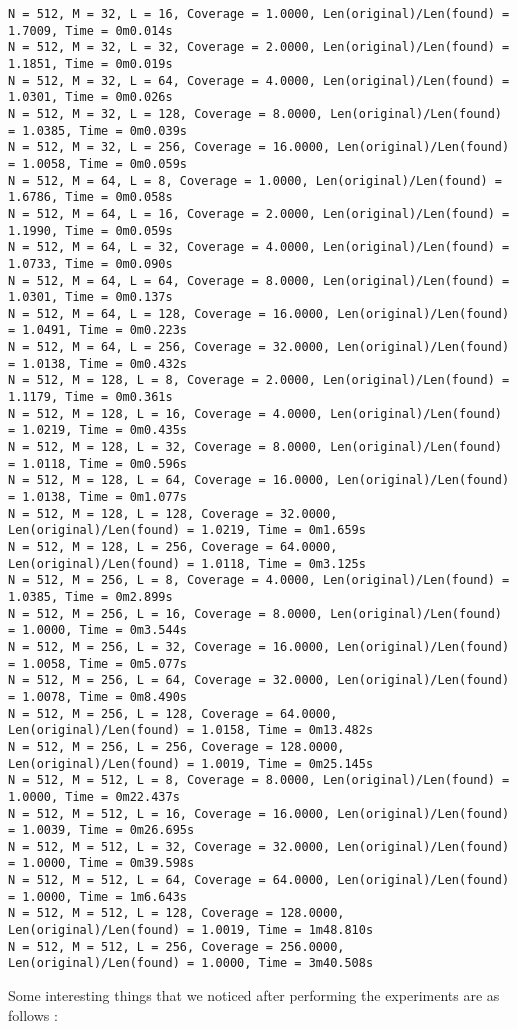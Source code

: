 \documentclass{article}
\begin{document}
{\begin{verbatim}
N = 512, M = 32, L = 16, Coverage = 1.0000, Len(original)/Len(found) = 1.7009, Time = 0m0.014s
N = 512, M = 32, L = 32, Coverage = 2.0000, Len(original)/Len(found) = 1.1851, Time = 0m0.019s
N = 512, M = 32, L = 64, Coverage = 4.0000, Len(original)/Len(found) = 1.0301, Time = 0m0.026s
N = 512, M = 32, L = 128, Coverage = 8.0000, Len(original)/Len(found) = 1.0385, Time = 0m0.039s
N = 512, M = 32, L = 256, Coverage = 16.0000, Len(original)/Len(found) = 1.0058, Time = 0m0.059s
N = 512, M = 64, L = 8, Coverage = 1.0000, Len(original)/Len(found) = 1.6786, Time = 0m0.058s
N = 512, M = 64, L = 16, Coverage = 2.0000, Len(original)/Len(found) = 1.1990, Time = 0m0.059s
N = 512, M = 64, L = 32, Coverage = 4.0000, Len(original)/Len(found) = 1.0733, Time = 0m0.090s
N = 512, M = 64, L = 64, Coverage = 8.0000, Len(original)/Len(found) = 1.0301, Time = 0m0.137s
N = 512, M = 64, L = 128, Coverage = 16.0000, Len(original)/Len(found) = 1.0491, Time = 0m0.223s
N = 512, M = 64, L = 256, Coverage = 32.0000, Len(original)/Len(found) = 1.0138, Time = 0m0.432s
N = 512, M = 128, L = 8, Coverage = 2.0000, Len(original)/Len(found) = 1.1179, Time = 0m0.361s
N = 512, M = 128, L = 16, Coverage = 4.0000, Len(original)/Len(found) = 1.0219, Time = 0m0.435s
N = 512, M = 128, L = 32, Coverage = 8.0000, Len(original)/Len(found) = 1.0118, Time = 0m0.596s
N = 512, M = 128, L = 64, Coverage = 16.0000, Len(original)/Len(found) = 1.0138, Time = 0m1.077s
N = 512, M = 128, L = 128, Coverage = 32.0000, Len(original)/Len(found) = 1.0219, Time = 0m1.659s
N = 512, M = 128, L = 256, Coverage = 64.0000, Len(original)/Len(found) = 1.0118, Time = 0m3.125s
N = 512, M = 256, L = 8, Coverage = 4.0000, Len(original)/Len(found) = 1.0385, Time = 0m2.899s
N = 512, M = 256, L = 16, Coverage = 8.0000, Len(original)/Len(found) = 1.0000, Time = 0m3.544s
N = 512, M = 256, L = 32, Coverage = 16.0000, Len(original)/Len(found) = 1.0058, Time = 0m5.077s
N = 512, M = 256, L = 64, Coverage = 32.0000, Len(original)/Len(found) = 1.0078, Time = 0m8.490s
N = 512, M = 256, L = 128, Coverage = 64.0000, Len(original)/Len(found) = 1.0158, Time = 0m13.482s
N = 512, M = 256, L = 256, Coverage = 128.0000, Len(original)/Len(found) = 1.0019, Time = 0m25.145s
N = 512, M = 512, L = 8, Coverage = 8.0000, Len(original)/Len(found) = 1.0000, Time = 0m22.437s
N = 512, M = 512, L = 16, Coverage = 16.0000, Len(original)/Len(found) = 1.0039, Time = 0m26.695s
N = 512, M = 512, L = 32, Coverage = 32.0000, Len(original)/Len(found) = 1.0000, Time = 0m39.598s
N = 512, M = 512, L = 64, Coverage = 64.0000, Len(original)/Len(found) = 1.0000, Time = 1m6.643s
N = 512, M = 512, L = 128, Coverage = 128.0000, Len(original)/Len(found) = 1.0019, Time = 1m48.810s
N = 512, M = 512, L = 256, Coverage = 256.0000, Len(original)/Len(found) = 1.0000, Time = 3m40.508s
\end{verbatim}
}
\clearpage
Some interesting things that we noticed after performing the experiments are as follows : 
\end{document}
